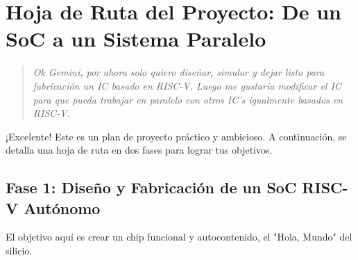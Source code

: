\documentclass[12pt,a4paper]{article}
\newenvironment{pregunta}
  {\begin{leftbar}\begin{quote}\itshape}
  {\end{quote}\end{leftbar}}
\begin{document}
\newpage
\section{Hoja de Ruta del Proyecto: De un SoC a un Sistema Paralelo}

\begin{pregunta}
Ok Gemini, por ahora solo quiero diseñar, simular y dejar listo para fabricación un IC basado en RISC-V. Luego me gustaría modificar el IC para que pueda trabajar en paralelo con otros IC's igualmente basados en RISC-V.
\end{pregunta}

¡Excelente! Este es un plan de proyecto práctico y ambicioso. A continuación, se detalla una hoja de ruta en dos fases para lograr tus objetivos.

\subsection{Fase 1: Diseño y Fabricación de un SoC RISC-V Autónomo}

El objetivo aquí es crear un chip funcional y autocontenido, el "Hola, Mundo" del silicio.
\end{document}
